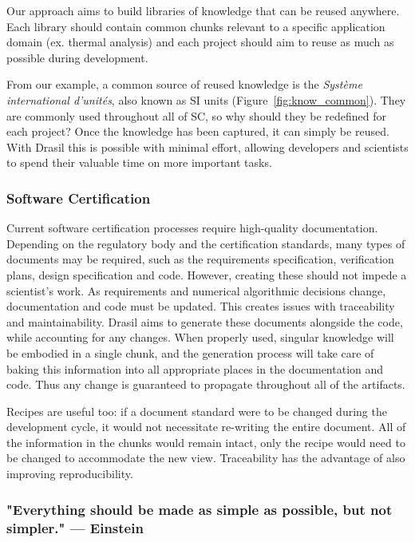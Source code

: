 \documentclass{sig-alternate-05-2015}
\newcommand{\lss}{Drasil}
\begin{document}
Our approach aims to build libraries of knowledge that can be reused anywhere.
Each library should contain common chunks relevant to a specific application
domain (ex. thermal analysis) and each project should aim to reuse as much as
possible during development.

From our example, a common source of reused knowledge is the 
\emph{Syst\`{e}me international d'unit\'{e}s}, also known as
SI units (Figure~\ref{fig:know_common}). They are commonly
used throughout all of SC, so why should they be redefined for each
project? Once the knowledge has been captured, it can simply be reused.
With \lss{} this is possible with minimal effort, allowing developers and
scientists to spend their valuable time on more important tasks.

\subsubsection{Software Certification} \label{sssec:adv_cert}

Current software certification processes require high-quality documentation.
Depending on the regulatory body and the certification standards, many types of
documents may be required, such as the requirements specification, verification
plans, design specification and code. However, creating these should not impede
a scientist's work. As requirements and numerical algorithmic decisions change,
documentation and code must be updated. This creates issues with traceability
and maintainability. \lss{} aims to generate these documents alongside the code,
while accounting for any changes. When properly used, singular knowledge will be
embodied in a single chunk, and the generation process will take care of baking
this information into all appropriate places in the documentation and code. Thus
any change is guaranteed to propagate throughout all of the artifacts.

Recipes are useful too: if a document standard were to be changed during the
development cycle, it would not necessitate re-writing the entire document. All
of the information in the chunks would remain intact, only the recipe would need
to be changed to accommodate the new view. Traceability has the advantage
of also improving reproducibility.

\subsubsection{"Everything should be made as simple as possible, but not
  simpler."  --- Einstein} \label{sssec:adv_simple}
\end{document}
